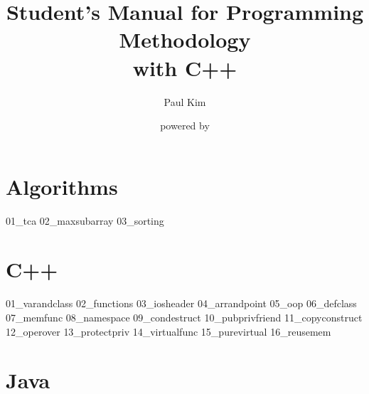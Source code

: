 \documentclass[10pt,openany,a4pper]{book}
\begin{document}
\begin{titlepage}
    \title{Student's Manual for Programming Methodology\\{\Large with C++}}
    \author{Paul Kim}
    \date{powered by \LaTeXe{}}
\maketitle
\end{titlepage}
\tableofcontents
\newpage

\part{Algorithms}

{01_tca}
{02_maxsubarray}
{03_sorting}

\part{C++}

{01_varandclass}
{02_functions}
{03_iosheader}
{04_arrandpoint}
{05_oop}
{06_defclass}
{07_memfunc}
{08_namespace}
{09_condestruct}
{10_pubprivfriend}
{11_copyconstruct}
{12_operover}
{13_protectpriv}
{14_virtualfunc}
{15_purevirtual}
{16_reusemem}

\part{Java}

\end{document}
